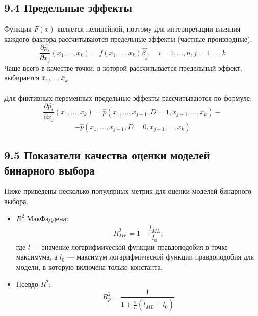 \documentclass[a0,final]{a0poster}
\begin{document}
\begin{multicols}{4}
\subsection*{9.4 Предельные эффекты}
Функция $F(x)$ является нелинейной, поэтому для интерпретации влияния каждого фактора рассчитываются предельные эффекты (частные производные):\\
\[\frac{\partial\hat{p_i}}{\partial x_j}(x_1, \ldots, x_k) = f(x_1, \ldots, x_k)\hat{\beta_j}, \quad i = 1, \ldots, n, j = 1, \ldots, k\]
Чаще всего в качестве точки, в которой рассчитывается предельный эффект, выбирается $\bar{x}_1, \ldots, \bar{x}_k$.\\
\\
Для фиктивных переменных предельные эффекты рассчитываются по формуле:\\
\[\frac{\partial\hat{p_i}}{\partial x_j}(x_1, \ldots, x_k) = \hat{p}(x_1, \ldots, x_{j-1}, D = 1, x_{j+1}, \ldots, x_k) - \]
\[-\hat{p}(x_1, \ldots, x_{j-1}, D = 0, x_{j+1}, \ldots, x_k)\]

\subsection*{9.5 Показатели качества оценки моделей бинарного выбора}
Ниже приведены несколько популярных метрик для оценки моделей бинарного выбора.\\
\begin{itemize}
\item $R^2$ МакФаддена:
\[R^2_{MF} = 1 - \frac{\hat{l}_{ML}}{l_0},\]
где $\hat{l}$ — значение логарифмической функции правдоподобия в точке максимума, а $l_0$ — максимум логарифмической функции правдоподобия для модели, в которую включена только константа.
\item Псевдо-$R^2$:
\[R^2_p = \frac{1}{1 + \frac{2}{n}(\hat{l}_{ML} - l_0)}\]
\end{itemize}


\end{multicols}
\end{document}
